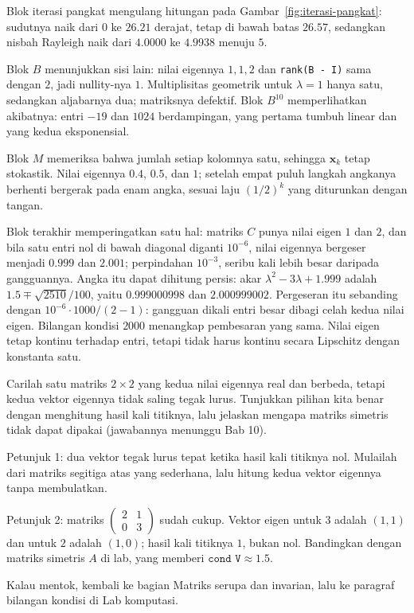 Blok iterasi pangkat mengulang hitungan pada Gambar~\ref{fig:iterasi-pangkat}: sudutnya naik dari
$0$ ke $26.21$ derajat, tetap di bawah batas $26.57$, sedangkan nisbah Rayleigh naik dari $4.0000$
ke $4.9938$ menuju $5$.

Blok $B$ menunjukkan sisi lain: nilai eigennya $1,1,2$ dan \texttt{rank(B - I)} sama dengan $2$,
jadi nullity-nya $1$. Multiplisitas geometrik untuk $\lambda=1$ hanya satu, sedangkan aljabarnya
dua; matriksnya defektif. Blok $B^{10}$ memperlihatkan akibatnya: entri $-19$ dan $1024$
berdampingan, yang pertama tumbuh linear dan yang kedua eksponensial.

Blok $M$ memeriksa bahwa jumlah setiap kolomnya satu, sehingga $\mathbf{x}_{k}$ tetap stokastik.
Nilai eigennya $0.4$, $0.5$, dan $1$; setelah empat puluh langkah angkanya berhenti bergerak pada
enam angka, sesuai laju $(1/2)^{k}$ yang diturunkan dengan tangan.

Blok terakhir memperingatkan satu hal: matriks $C$ punya nilai eigen $1$ dan $2$, dan bila satu entri
nol di bawah diagonal diganti $10^{-6}$, nilai eigennya bergeser menjadi $0.999$ dan $2.001$;
perpindahan $10^{-3}$, seribu kali lebih besar daripada gangguannya. Angka itu dapat dihitung
persis: akar $\lambda^{2}-3\lambda+1.999$ adalah $1.5\mp\sqrt{2510}/100$, yaitu $0.999000998$ dan
$2.000999002$. Pergeseran itu sebanding dengan $10^{-6}\cdot1000/(2-1)$: gangguan dikali entri besar
dibagi celah kedua nilai eigen. Bilangan kondisi $2000$ menangkap pembesaran yang sama. Nilai eigen
tetap kontinu terhadap entri, tetapi tidak harus kontinu secara Lipschitz dengan konstanta satu.

\begin{tantangan}
Carilah satu matriks $2\times2$ yang kedua nilai eigennya real dan berbeda, tetapi kedua vektor
eigennya tidak saling tegak lurus. Tunjukkan pilihan kita benar dengan menghitung hasil kali
titiknya, lalu jelaskan mengapa matriks simetris tidak dapat dipakai (jawabannya menunggu Bab 10).

Petunjuk 1: dua vektor tegak lurus tepat ketika hasil kali titiknya nol. Mulailah dari matriks
segitiga atas yang sederhana, lalu hitung kedua vektor eigennya tanpa membulatkan.

Petunjuk 2: matriks $\begin{pmatrix}2&1\\0&3\end{pmatrix}$ sudah cukup. Vektor eigen untuk $3$
adalah $(1,1)$ dan untuk $2$ adalah $(1,0)$; hasil kali titiknya $1$, bukan nol. Bandingkan dengan
matriks simetris $A$ di lab, yang memberi $\texttt{cond V}\approx1.5$.

Kalau mentok, kembali ke bagian Matriks serupa dan invarian, lalu ke paragraf bilangan kondisi di
Lab komputasi.
\end{tantangan}


